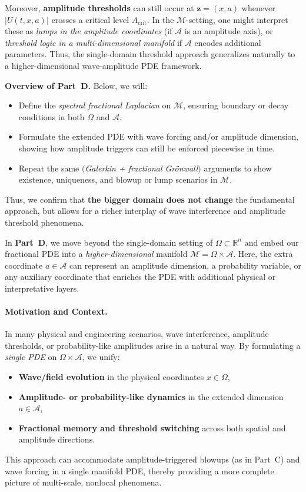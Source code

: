 \documentclass[12pt]{article}
\begin{document}
Moreover, \textbf{amplitude thresholds} can still occur at \(\mathbf{z}=(x,a)\) 
whenever \( |U(t,x,a)|\) crosses a critical level \(A_{\mathrm{crit}}\).  In the 
\(\mathcal{M}\)-setting, one might interpret these as \emph{lumps in the amplitude 
coordinates} (if \(\mathcal{A}\) is an amplitude axis), or \emph{threshold logic in a 
multi-dimensional manifold} if \(\mathcal{A}\) encodes additional parameters.  Thus, 
the single-domain threshold approach generalizes naturally to a higher-dimensional 
wave-amplitude PDE framework.

\bigskip

\noindent
\textbf{Overview of Part~D.} Below, we will:
\begin{itemize}
    \item Define the \emph{spectral fractional Laplacian} on \(\mathcal{M}\), 
          ensuring boundary or decay conditions in both \(\Omega\) and \(\mathcal{A}\).
    \item Formulate the extended PDE with wave forcing and/or amplitude dimension, 
          showing how amplitude triggers can still be enforced piecewise in time.
    \item Repeat the same \(\bigl(\!\)\emph{Galerkin + fractional Grönwall}\(\bigr)\) 
          arguments to show existence, uniqueness, and blowup or lump scenarios in 
          \(\mathcal{M}\).
\end{itemize}
Thus, we confirm that \textbf{the bigger domain does not change} the fundamental approach, 
but allows for a richer interplay of wave interference and amplitude threshold phenomena.


In \textbf{Part~D}, we move beyond the single-domain setting of $\Omega\subset\mathbb{R}^n$ 
and embed our fractional PDE into a \emph{higher-dimensional} manifold 
\(\mathcal{M}=\Omega\times \mathcal{A}\). Here, the extra coordinate \(a\in\mathcal{A}\) 
can represent an amplitude dimension, a probability variable, or any auxiliary coordinate 
that enriches the PDE with additional physical or interpretative layers. 

\paragraph{Motivation and Context.}
In many physical and engineering scenarios, wave interference, amplitude thresholds, or 
probability-like amplitudes arise in a natural way. By formulating a \emph{single PDE} 
on \(\Omega\times \mathcal{A}\), we unify:
\begin{itemize}
  \item \textbf{Wave/field evolution} in the physical coordinates \(x\in\Omega\),
  \item \textbf{Amplitude- or probability-like dynamics} in the extended dimension 
        \(a\in\mathcal{A}\),
  \item \textbf{Fractional memory and threshold switching} across both spatial and 
        amplitude directions. 
\end{itemize}
This approach can accommodate amplitude-triggered blowups (as in Part~C) and wave forcing 
in a single manifold PDE, thereby providing a more complete picture of multi-scale, 
nonlocal phenomena.
\end{document}
